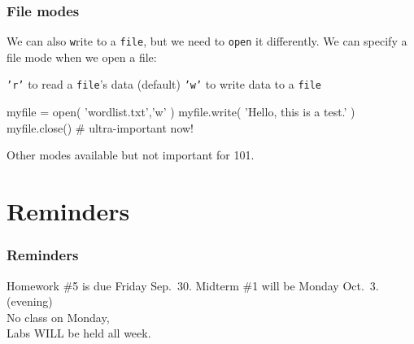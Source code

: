 \documentclass[11pt]{beamer}
\begin{document}
\begin{frame}[fragile]
  \frametitle{File modes}
  \Enlarge

  \begin{itemize}
  \myitem  We can also \texttt{w}rite to a \texttt{file}, but we need to \texttt{open} it differently. \pause
  \myitem  We can specify a file mode when we open a file:
    \begin{itemize}
    \mysubitem  \texttt{'r'} to read a \texttt{file}'s data (default)
    \mysubitem  \texttt{'w'} to write data to a \texttt{file}
    \end{itemize}
  \end{itemize} \pause
  \begin{semiverbatim}
myfile = open( 'wordlist.txt','w' )
myfile.write( 'Hello, this is a test.' )
myfile.close()  # ultra-important now!
  \end{semiverbatim}
  \begin{itemize}
  \myitem  Other modes available but not important for 101.
  \end{itemize}
\end{frame}


\section{Reminders}

\begin{frame}
  \frametitle{Reminders}
  \Enlarge

  \begin{itemize}
  \myitem  Homework \#5 is due Friday Sep.\ 30.
  \myitem  Midterm \#1 will be Monday Oct.\ 3.  (evening) \\ \textcolor{CS101GradBot}{No class on Monday, \\ Labs WILL be held all week.}
  \end{itemize}
\end{frame}
\end{document}

